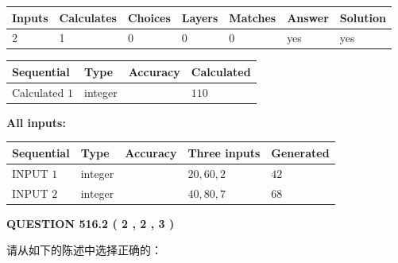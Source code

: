 \documentclass{ctexart}
\begin{document}
 
\noindent{}
 
 

 
   
   
   
   
\noindent\begin{tabular}{|l|l|l|l|l|l|l|}
 \hline
Inputs & Calculates & Choices & Layers & Matches & Answer & Solution \\ \hline
 2  & 
 1  & 
 0
  & 
 0  & 
 0  & 
  yes & 
  yes 
  \\ \hline
 \end{tabular}
   
   
   
   
\noindent{}
   
   
  
  
\noindent\begin{tabular}{|l|l|l|l|}
\hline
 Sequential & Type & Accuracy & Calculated \\ 
\hline
 
 
  Calculated $  1 $ & integer &  & 
  $ 110 $ 
 \\  \hline  
 \end{tabular}
   
   
   
   
\noindent\vspace{0.1in}\hspace{-0.08in} {\textbf{\Large{All inputs: }}}
   
   
  
  
\noindent\begin{tabular}{|l|l|l|l|l|}
\hline
 Sequential & Type & Accuracy & Three inputs & Generated \\ 
\hline
 
 
  INPUT $  1 $ & integer &  & $
 20
 , 
 60
 , 
 2
 $ & $ 42 $ 
 \\  \hline  
 
 
  INPUT $  2 $ & integer &  & $
 40
 , 
 80
 , 
 7
 $ & $ 68 $ 
 \\  \hline  
 \end{tabular}
   
   
  
\vspace{0.2in}
  
{\textbf{\Large{QUESTION
516.2 
 ( 2 , 2 , 3 )
}}}
  
  
请从如下的陈述中选择正确的：
 
\end{document}
